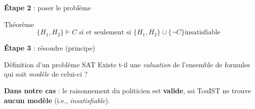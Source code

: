\documentclass[english,french,usenames,dvipsnames]{beamer}
\begin{document}
\begin{frame}{\subsecname}
\begin{center}\textbf{Étape 2} : poser le problème\end{center}
\begin{block}{Théorème}
\[\{H_1, H_2\} \models C \mbox{ si et seulement si } \{H_1, H_2\} \cup \{\neg C\} \text{insatisfiable}\]
\end{block}
\end{frame}

\begin{frame}{\subsecname}
\begin{center}\textbf{Étape 3} : résoudre (principe)\end{center}
\begin{block}{Définition d'un problème SAT}
Existe t-il une \emph{valuation} de l'ensemble de formules qui soit \emph{modèle} de celui-ci ?
\end{block}

\textbf{Dans notre cas} : le raisonnement du politicien est \textbf{valide},  ssi TouIST ne trouve \textbf{aucun modèle} (i.e., \emph{insatisfiable}).
\end{frame}
\end{document}
